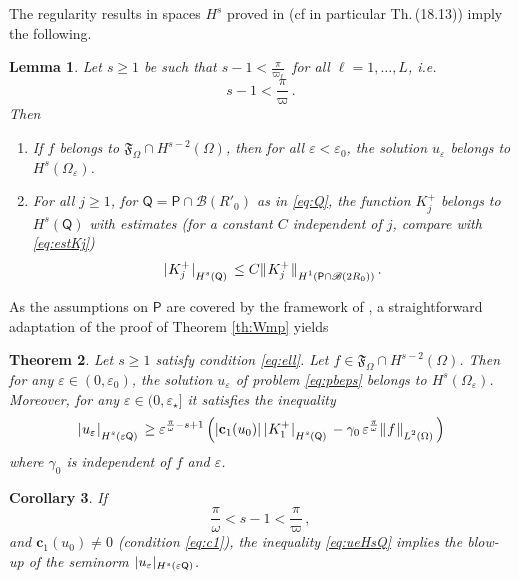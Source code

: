 \documentclass[titlepage,12pt]{amsart}
\newtheorem{theorem}{Theorem}[section]
\newtheorem{lemma}[theorem]{Lemma}
\newtheorem{corollary}[theorem]{Corollary}
\theoremstyle{definition}
\theoremstyle{remark}
\numberwithin{equation}{section}
\newcommand{\ee}{\hskip0.15ex}
\newcommand{\dd}[1]{_{\raise-0.6ex\hbox{$\scriptstyle #1$}}}
\newcommand {\Norm}[2]{ \mathchoice
    {|\ee #1\ee|\dd{#2}\,}
    {| #1 |_{#2}}
    {| #1 |_{#2}}
    {| #1 |_{#2}} }
\newcommand {\DNorm}[2]{ \mathchoice
    {\|\ee #1\ee\|\dd{#2}\,}
    {\| #1 \|_{#2}}
    {\| #1 \|_{#2}}
    {\| #1 \|_{#2}} }
\newcommand{\sB}{{\mathscr B}}
\newcommand{\rP}{{\mathsf{P}}}
\newcommand{\rQ}{{\mathsf{Q}}}
\newcommand {\gF}{\mathfrak{F}}
\begin{document}
{\begin{figure}[h]
\end{figure}

The regularity results in spaces $H^s$ proved in \cite{DBook:1988} (cf in particular Th.\,(18.13)) imply the following.

\begin{lemma}
\label{lem:Hs}
Let $s\ge1$ be such that $s - 1 < \frac{\pi}{\varpi_\ell}\,$ for all $\ell=1,\ldots,L$, i.e.
\begin{equation}
\label{eq:ell}
   s - 1 < \frac{\pi}{\varpi}\,.
\end{equation}
Then
\begin{enumerate}
\item If $f$ belongs to $\gF_\Omega\cap H^{s-2}(\Omega)$, then for all $\varepsilon<\varepsilon_0$, the solution $u_\varepsilon$ belongs to $H^s(\Omega_\varepsilon)$.
\item For all $j\ge1$, for $\rQ=\rP\cap \sB(R'_0)$ as in \eqref{eq:Q}, the function $K^+_j$ belongs to $H^s(\rQ)$ with estimates (for a constant $C$ independent of $j$, compare with \eqref{eq:estKj})
\[
   \Norm{K^+_j}{H^s(\rQ)} \le 
   C \DNorm{K^+_j}{H^{1}(\rP\cap\sB(2R_0))} .
\]
\end{enumerate}
\end{lemma}

As the assumptions on $\rP$ are covered by the framework of \cite{CoDa2Mu:2024}, a straightforward adaptation of the proof of Theorem \ref{th:Wmp} yields
\begin{theorem}
\label{th:Hs}
Let $s\ge1$ satisfy condition \eqref{eq:ell}.
Let $f\in\gF_\Omega\cap H^{s-2}(\Omega)$.
Then for any $\varepsilon\in(0,\varepsilon_0)$, the solution $u_\varepsilon$ of problem \eqref{eq:pbeps} belongs to $H^s(\Omega_\varepsilon)$. Moreover, for any $\varepsilon\in(0,\varepsilon_\star]$ it 
satisfies the inequality
\begin{equation}
\label{eq:ueHsQ}
   \Norm{u_\varepsilon}{H^s(\varepsilon\rQ)} \ge 
   \varepsilon^{\frac{\pi}{\omega}-s+1} \left( 
   |\mathbf{c}_1(u_0)|\, \Norm{K^+_1}{H^s(\rQ)}
   - \gamma_0\,\varepsilon^{\frac{\pi}{\omega}} \DNorm{f}{L^2(\Omega)}
   \right)
\end{equation}
where $\gamma_0$ is independent of $f$ and $\varepsilon$.
\end{theorem}


\begin{corollary}
If
\begin{equation}
\label{eq:l1Lell}
   \frac{\pi}{\omega} < s-1 < \frac{\pi}{\varpi}\,,
\end{equation}
and $\mathbf{c}_1(u_0)\neq0$ (condition \eqref{eq:c1}), the inequality \eqref{eq:ueHsQ} implies the blow-up of the seminorm $\Norm{u_\varepsilon}{H^s(\varepsilon\rQ)}$.
\end{corollary}
}
\end{document}
